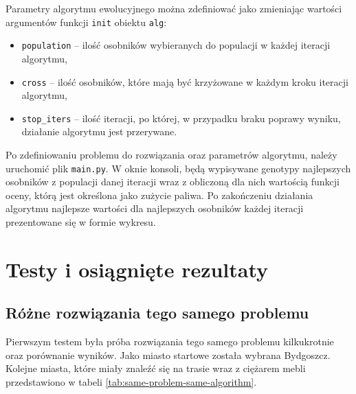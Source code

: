 \documentclass[12pt, oneside, final]{report}
\begin{document}
Parametry algorytmu ewolucyjnego można zdefiniować jako zmieniając wartości argumentów funkcji \texttt{init} obiektu \texttt{alg}:
\begin{itemize}
\item \texttt{population} -- ilość osobników wybieranych do populacji w każdej iteracji algorytmu,
\item \texttt{cross} -- ilość osobników, które mają być krzyżowane w każdym kroku iteracji algorytmu,
\item \texttt{stop\_iters} -- ilość iteracji, po której, w przypadku braku poprawy wyniku, działanie algorytmu jest przerywane.
\end{itemize}

Po zdefiniowaniu problemu do rozwiązania oraz parametrów algorytmu, należy uruchomić plik \texttt{main.py}. W oknie konsoli, będą wypisywane genotypy najlepszych osobników z populacji danej iteracji wraz z obliczoną dla nich wartością funkcji oceny, którą jest określona jako zużycie paliwa.
 Po zakończeniu działania algorytmu najlepsze wartości dla najlepszych osobników każdej iteracji prezentowane się w formie wykresu.

\chapter{Testy i osiągnięte rezultaty}

\section{Różne rozwiązania tego samego problemu}
Pierwszym testem była próba rozwiązania tego samego problemu kilkukrotnie oraz porównanie wyników. Jako miasto startowe została wybrana Bydgoszcz. Kolejne miasta, które miały znaleźć się na trasie wraz z ciężarem mebli przedstawiono w tabeli \ref{tab:same-problem-same-algorithm}.

\begin{table}[ht!]
\caption{Definicja problemu do rozwiązania w pierwszym teście}
\label{tab:same-problem-same-algorithm}
\centering
{}
\end{table}
\end{document}
